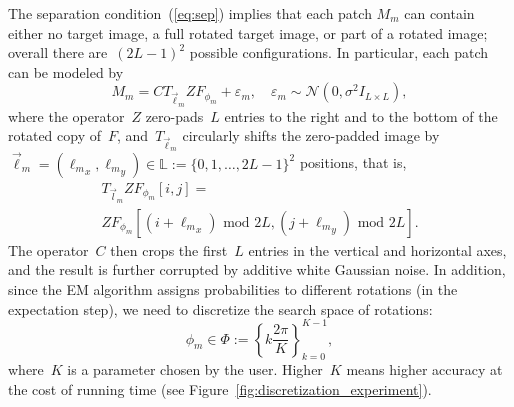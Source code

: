 \documentclass{article}
\begin{document}
The separation condition~(\ref{eq:sep}) implies that each patch $M_m$ can contain either no target image, a full rotated target image, or part of a rotated image; overall there are~$(2L-1)^2$ possible configurations. In particular, each patch can be modeled by
\begin{equation}
\label{eq:patch}
M_m = C T_{\vec{\ell}_m} Z F_{\phi_m} + \varepsilon_m, \quad \varepsilon_m \sim \mathcal{N}(0, \sigma^2 I_{L \times L}),
\end{equation}
where the operator~$Z$ \mbox{zero-pads}~$L$ entries to the right and to the bottom of the rotated copy of~$F$, and~$T_{\vec{\ell}_m}$ circularly shifts the \mbox{zero-padded} image by~\mbox{$\vec{\ell}_m = ({\ell_m}_x, {\ell_m}_y)\in \mathbb{L} := \{0, 1, \ldots, 2L-1\}^2$} positions, that is,
\begin{multline}
T_{\vec{l}_m} Z F_{\phi_m} \left[i, j\right] = \\Z F_{\phi_m} \left[(i + {\ell_m}_x) \text{ mod } 2L, (j + {\ell_m}_y) \text{ mod } 2L\right].
\end{multline}
The operator~$C$ then crops the first~$L$ entries in the vertical and horizontal axes, and the result is further corrupted by additive white Gaussian noise. In addition, since the EM algorithm assigns probabilities to different rotations (in the expectation step), we need to discretize the search space of rotations:
\begin{equation}
\label{eq:Phi_set}
\phi_m \in \Phi := \left\{k \frac{2\pi}{K}\right\}_{k=0}^{K-1},
\end{equation}
where~$K$ is a parameter chosen by the user. Higher~$K$ means higher accuracy at the cost of running time (see Figure~\ref{fig:discretization_experiment}).
\end{document}

